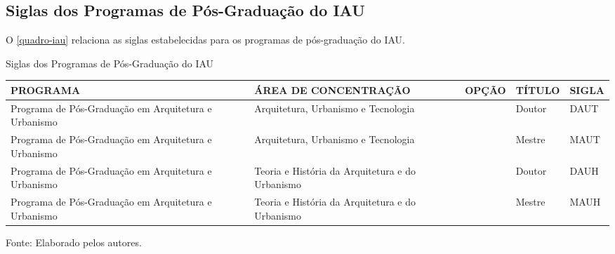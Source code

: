 \begin{apendicesenv}
\chapter{Siglas dos Programas de Pós-Graduação do IAU}
O \autoref{quadro-iau} relaciona as siglas estabelecidas para os programas de pós-graduação do IAU.
\begin{quadro}[htb]
\ABNTEXfontereduzida
\caption[Siglas dos Programas de Pós-Graduação do IAU]{Siglas dos Programas de Pós-Graduação do IAU}
\label{quadro-iau}
\begin{tabular}{|p{3.5cm}|p{3.5cm}|p{3.5cm}|p{1.5cm}|p{2.25cm}|}
  \hline
   \textbf{PROGRAMA} & \textbf{ÁREA DE CONCENTRAÇÃO} & \textbf{OPÇÃO} & \textbf{TÍTULO} & \textbf{SIGLA}  \\
    \hline
Programa de Pós-Graduação em Arquitetura e Urbanismo & Arquitetura, Urbanismo e Tecnologia &  & Doutor & DAUT\\
Programa de Pós-Graduação em Arquitetura e Urbanismo & Arquitetura, Urbanismo e Tecnologia &  & Mestre & MAUT\\
Programa de Pós-Graduação em Arquitetura e Urbanismo & Teoria e História da Arquitetura e do Urbanismo &  & Doutor & DAUH\\
Programa de Pós-Graduação em Arquitetura e Urbanismo & Teoria e História da Arquitetura e do Urbanismo &  & Mestre & MAUH\\
    \hline

\end{tabular}
\begin{flushleft}
		Fonte: Elaborado pelos autores.\
\end{flushleft}
\end{quadro}


\end{apendicesenv}
